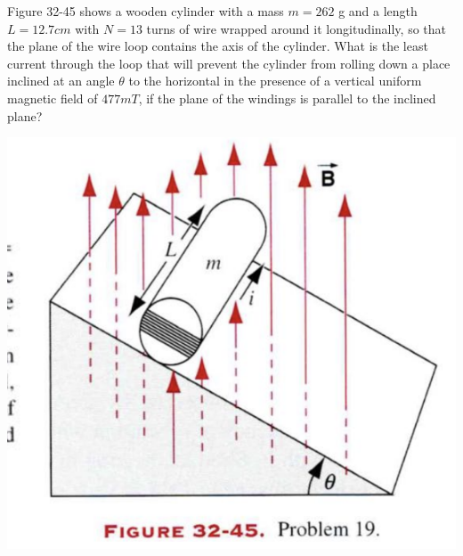 \documentclass[11pt,letterpaper,boxed]{hmcpset}
\begin{document}
\begin{problem}[HRK P32.19]
Figure 32-45 shows a wooden cylinder with a mass $m= 262$ g and a length $L= 12.7 cm$ with $N = 13$ turns of wire wrapped around it longitudinally, so that the plane of the wire loop contains the axis of the cylinder. What is the least current through the loop that will prevent the cylinder from rolling down a place inclined at an angle $\theta$ to the horizontal in the presence of a vertical uniform magnetic field of $477 mT$, if the plane of the windings is parallel to the inclined plane?
\begin{center}
\includegraphics[scale=.6]{32-45.png}
\end{center}
\end{problem}

\begin{solution}
\vfill
\end{solution}
\newpage
\end{document}
